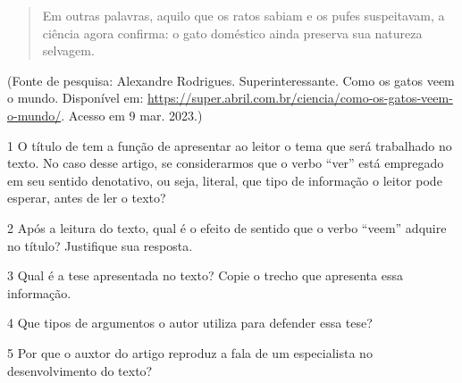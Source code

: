 \begin{quote}
Em outras palavras, aquilo que os ratos sabiam e os pufes suspeitavam, a
ciência agora confirma: o gato doméstico ainda preserva sua natureza
selvagem.
\end{quote}

(Fonte de pesquisa: Alexandre Rodrigues. Superinteressante. Como os
gatos veem o mundo. Disponível em:
\url{https://super.abril.com.br/ciencia/como-os-gatos-veem-o-mundo/}.
Acesso em 9 mar. 2023.)

\num{1} O título de tem a função de apresentar ao leitor o tema que será
trabalhado no texto. No caso desse artigo, se considerarmos que o verbo
``ver'' está empregado em seu sentido denotativo, ou seja, literal, que
tipo de informação o leitor pode esperar, antes de ler o texto?



\num{2} Após a leitura do texto, qual é o efeito de sentido que o verbo
``veem'' adquire no título? Justifique sua resposta.



\num{3} Qual é a tese apresentada no texto? Copie o trecho que apresenta
essa informação.





\num{4} Que tipos de argumentos o autor utiliza para defender essa tese?



\num{5} Por que o auxtor do artigo reproduz a fala de um especialista no
desenvolvimento do texto?



